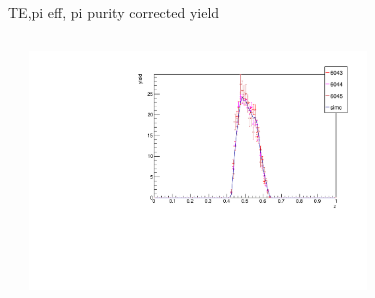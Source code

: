\begin{frame}{TE,pi eff, pi purity corrected yield}
\begin{columns}
\begin{column}[T]{0.5\textwidth}
\end{column}
\begin{column}[T]{0.5\textwidth}
\includegraphics[width = 0.7\textwidth]{results/yield/check/yieldcheck_90_pos.pdf}
\end{column}
\end{columns}
\end{frame}
